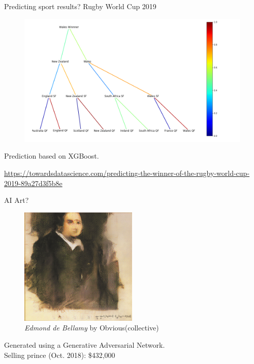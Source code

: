 \documentclass[handout]{beamer}
\begin{document}
\begin{frame}{Predicting sport results?}
Rugby World Cup 2019
   \begin{figure}
\includegraphics[width=.9\textwidth]{fig/L1/predicting-rugby.png} 
\end{figure}
Prediction based on XGBoost.
\begin{scriptsize}
   \url{https://towardsdatascience.com/predicting-the-winner-of-the-rugby-world-cup-2019-89a27d3f5b8e}
\end{scriptsize}

\end{frame}

\begin{frame}{AI Art?}
    \begin{figure}
        \centering
        \includegraphics[width=0.5\textwidth]{fig/L3/478px-Edmond_de_Belamy.png}
        \caption*{\textit{Edmond de Bellamy} by Obvious(collective)}
    \end{figure}
    Generated using a Generative Adversarial Network.\\
    Selling prince (Oct. 2018): \$432,000
\end{frame}
\end{document}
